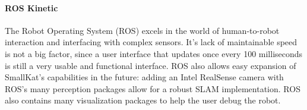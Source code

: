         \paragraph*{ROS Kinetic}
        The Robot Operating System (ROS) excels in the world of human-to-robot interaction and interfacing with complex sensors. It's lack of maintainable speed is not a big factor, since a user interface that updates once every 100 milliseconds is still a very usable and functional interface. ROS also allows easy expansion of SmallKat's capabilities in the future: adding an Intel RealSense camera with ROS's many perception packages allow for a robust SLAM implementation. ROS also contains many visualization packages to help the user debug the robot.




        
